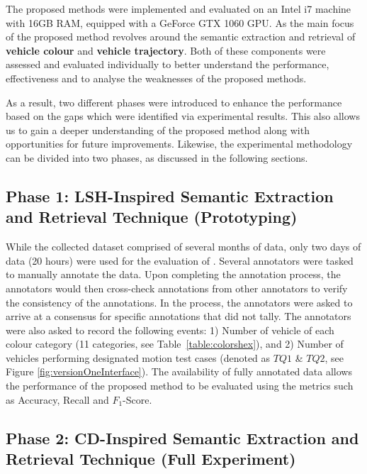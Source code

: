 The proposed methods were implemented and evaluated on an Intel i7 machine with 16GB RAM, equipped with a GeForce GTX 1060 GPU. As the main focus of the proposed method revolves around the semantic extraction and retrieval of \textbf{vehicle colour} and \textbf{vehicle trajectory}. Both of these components were assessed and evaluated individually to better understand the performance, effectiveness and to analyse the weaknesses of the proposed methods.

As a result, two different phases were introduced to enhance the performance based on the 
gaps which were identified via experimental results. This also allows us to gain a deeper understanding of the proposed method along with opportunities for future improvements.
Likewise, the experimental methodology can be divided into two phases, as discussed in the following sections.


\subsection{Phase 1: LSH-Inspired Semantic Extraction and Retrieval Technique (Prototyping)}
While the collected dataset comprised of several months of data, only two days of data (20 hours) were used for the evaluation of \versionOneRet. Several annotators were tasked to manually annotate the data. Upon completing the annotation process, the annotators would then cross-check annotations from other annotators to verify the consistency of the annotations.
In the process, the annotators were asked to arrive at a consensus for specific annotations that did not tally. The annotators were also asked to record the following events:
1) Number of vehicle of each colour category (11 categories, see Table~\ref{table:colorshex}), and 2) Number of vehicles performing designated motion test cases (denoted as $TQ1$ \& $TQ2$, see Figure \ref{fig:versionOneInterface}).
The availability of fully annotated data allows the performance of the proposed method to be evaluated using the metrics such as Accuracy, Recall and $F_1$-Score.

\subsection{Phase 2: CD-Inspired Semantic Extraction and Retrieval Technique (Full Experiment)}

